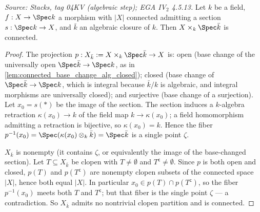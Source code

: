 \begin{lemma}\leanok
  \label{lem:connected_base_change_algebraic_closure}
  \textit{Source: Stacks, tag 04KV (algebraic step); EGA IV\(_2\) 4.5.13.}
  Let \(k\) be a field, \(f : X \to \Spec k\) a morphism with \(|X|\)
  connected admitting a section \(s : \Spec k \to X\), and
  \(\bar k\) an algebraic closure of \(k\). Then
  \(X \times_k \Spec \bar k\) is connected.
\end{lemma}
\begin{proof}
  \leanok
  The projection \(p : X_{\bar k} := X \times_k \Spec \bar k \to X\) is:
  open (base change of the universally open \(\Spec \bar k \to \Spec
  k\), as in \cref{lem:connected_base_change_alg_closed}); closed
  (base change of \(\Spec \bar k \to \Spec k\), which is integral
  because \(\bar k / k\) is algebraic, and integral morphisms are
  universally closed); and surjective (base change of a surjection).
  Let \(x_0 = s(\ast)\) be the image of the section. The section
  induces a \(k\)-algebra retraction \(\kappa(x_0) \to k\) of the field
  map \(k \to \kappa(x_0)\); a field homomorphism admitting a
  retraction is bijective, so \(\kappa(x_0) = k\). Hence the fiber
  \(p^{-1}(x_0) = \Spec(\kappa(x_0) \otimes_k \bar k) = \Spec \bar k\)
  is a single point \(\zeta\).

  \(X_{\bar k}\) is nonempty (it contains \(\zeta\), or equivalently
  the image of the base-changed section). Let \(T \subseteq
  X_{\bar k}\) be clopen with \(T \neq \emptyset\) and
  \(T^{\mathsf c} \neq \emptyset\). Since \(p\) is both open and
  closed, \(p(T)\) and \(p(T^{\mathsf c})\) are nonempty clopen subsets
  of the connected space \(|X|\), hence both equal \(|X|\). In
  particular \(x_0 \in p(T) \cap p(T^{\mathsf c})\), so the fiber
  \(p^{-1}(x_0)\) meets both \(T\) and \(T^{\mathsf c}\); but that
  fiber is the single point \(\zeta\) — a contradiction. So
  \(X_{\bar k}\) admits no nontrivial clopen partition and is
  connected.
\end{proof}

